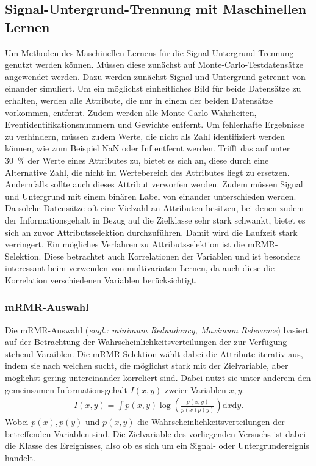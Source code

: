 \subsection{Signal-Untergrund-Trennung mit Maschinellen Lernen}
\label{Signal}
Um Methoden des Maschinellen Lernens für die Signal-Untergrund-Trennung genutzt werden können. Müssen diese zunächst auf Monte-Carlo-Testdatensätze angewendet werden. Dazu werden zunächst Signal und Untergrund getrennt von einander simuliert. Um ein möglichst einheitliches Bild für beide Datensätze zu erhalten, werden alle Attribute, die nur in einem der beiden Datensätze vorkommen, entfernt. Zudem werden alle Monte-Carlo-Wahrheiten, Eventidentifikationsnummern und Gewichte entfernt. Um fehlerhafte Ergebnisse zu verhindern, müssen zudem Werte, die nicht als Zahl identifiziert werden können, wie zum Beispiel NaN oder Inf entfernt werden. Trifft das auf unter \SI{30}{\percent} der Werte eines Attributes zu, bietet es sich an, diese durch eine Alternative Zahl, die nicht im Wertebereich des Attributes liegt zu ersetzen. Andernfalls sollte auch dieses Attribut verworfen werden. Zudem müssen Signal und Untergrund mit einem binären Label von einander unterschieden werden.\\
Da solche Datensätze oft eine Vielzahl an Attributen besitzen, bei denen zudem der Informationsgehalt in Bezug auf die Zielklasse sehr stark schwankt, bietet es sich an zuvor Attributsselektion durchzuführen. Damit wird die Laufzeit stark verringert. Ein mögliches Verfahren zu Attributsselektion ist die mRMR-Selektion. Diese betrachtet auch Korrelationen der Variablen und ist besonders interessant beim verwenden von multivariaten Lernen, da auch diese die Korrelation verschiedenen Variablen berücksichtigt.
\subsubsection{mRMR-Auswahl}
Die mRMR-Auswahl (\textit{engl.: minimum Redundancy, Maximum Relevance}) basiert auf der Betrachtung der Wahrscheinlichkeitsverteilungen der zur Verfügung stehend Varaiblen. Die mRMR-Selektion wählt dabei die Attribute iterativ aus, indem sie nach welchen sucht, die möglichst stark mit der Zielvariable, aber möglichst gering untereinander korreliert sind. Dabei nutzt sie unter anderem den gemeinsamen Informationsgehalt $I(x,y)$ zweier Variablen $x,y$:
\begin{align}
	I(x,y) = \int p(x,y) \log\left(\frac{p(x,y)}{p(x)p(y)}\right)\text{d}x\text{d}y.
\end{align}
Wobei $p(x), p(y)$ und $p(x,y)$ die Wahrscheinlichkeitsverteilungen der betreffenden Variablen sind. Die Zielvariable des vorliegenden Versuchs ist dabei die Klasse des Ereignisses, also ob es sich um ein Signal- oder Untergrundereignis handelt.
